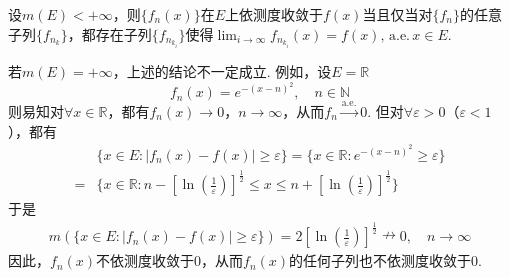 \documentclass[../../main.tex]{subfiles}%
\begin{document}
\begin{corollary}\label{corollary:Riesz定理推论}
设\(m(E) < +\infty\)，则$\{f_n(x)\}$在$E$上依测度收敛于$f(x)$当且仅当对\(\{f_n\}\)的任意子列\(\{f_{n_k}\}\)，都存在子列\(\{f_{n_{k_i}}\}\)使得$\lim_{i\to \infty}f_{n_{k_i}}(x)= f(x),\,\text{a.e.}\,x\in E.$
\end{corollary}
\begin{remark}
若\(m(E) = +\infty\)，上述的结论不一定成立. 例如，设\(E = \mathbb{R}\)
\[f_n(x) = e^{-(x - n)^2}, \quad n \in \mathbb{N}\]
则易知对\(\forall x \in \mathbb{R}\)，都有\(f_n(x) \to 0\)，\(n \to \infty\)，从而\(f_n \stackrel{\text{a.e.}}{\longrightarrow} 0\). 但对\(\forall \varepsilon > 0\)（\(\varepsilon < 1\)），都有
\begin{align*}
&\{x \in E : |f_n(x) - f(x)| \geqslant \varepsilon\} = \{x \in \mathbb{R} : e^{-(x - n)^2} \geqslant \varepsilon\} \\
=& \{x \in \mathbb{R} : n - \left[\ln \left(\frac{1}{\varepsilon}\right)\right]^{\frac{1}{2}} \leqslant x \leqslant n + \left[\ln \left(\frac{1}{\varepsilon}\right)\right]^{\frac{1}{2}}\}
\end{align*}
于是
\begin{align*}
m(\{x \in E : |f_n(x) - f(x)| \geqslant \varepsilon\}) = 2\left[\ln \left(\frac{1}{\varepsilon}\right)\right]^{\frac{1}{2}} \nrightarrow 0, \quad n \to \infty
\end{align*}
因此，\(f_n(x)\)不依测度收敛于\(0\)，从而\(f_n(x)\)的任何子列也不依测度收敛于\(0\). 
\end{remark}
\end{document}
